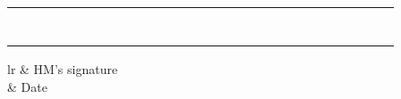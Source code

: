 \documentclass[12pt]{article}
\begin{document}
\begin{longtable}{|l|p{3.0cm}|p{3.0cm}|p{3.0cm}|l|p{1cm}|l|l|l|l|l|l|l|l|l|l|l|l|l|l|l|l|l|l|l|l|l|}
 & \relax & \relax & \relax & \relax & \relax & \relax & \relax & & & & & & & & & & & & & & & & & & & \\ \hline
 & \relax & \relax & \relax & \relax & \relax & \relax & \relax & & & & & & & & & & & & & & & & & & & \\ \hline
 & \relax & \relax & \relax & \relax & \relax & \relax & \relax & & & & & & & & & & & & & & & & & & & \\ \hline
 & \relax & \relax & \relax & \relax & \relax & \relax & \relax & & & & & & & & & & & & & & & & & & & \\ \hline
 & \relax & \relax & \relax & \relax & \relax & \relax & \relax & & & & & & & & & & & & & & & & & & & \\ \hline
 & \relax & \relax & \relax & \relax & \relax & \relax & \relax & & & & & & & & & & & & & & & & & & & \\ \hline
 & \relax & \relax & \relax & \relax & \relax & \relax & \relax & & & & & & & & & & & & & & & & & & & \\ \hline
 & \relax & \relax & \relax & \relax & \relax & \relax & \relax & & & & & & & & & & & & & & & & & & & \\ \hline
\end{longtable}



    \begin{tabular}{lr}
     & HM's signature \\
    & Date
    \end{tabular}
  
\end{document}
